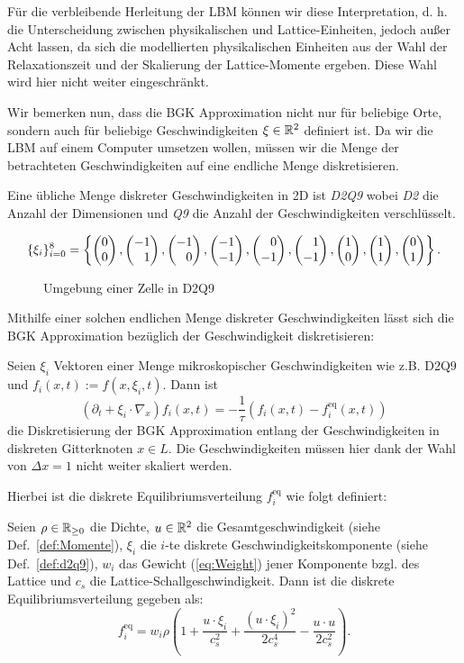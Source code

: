 Für die verbleibende Herleitung der LBM können wir diese Interpretation, d. h. die Unterscheidung zwischen physikalischen und Lattice-Einheiten, jedoch außer Acht lassen, da sich die modellierten physikalischen Einheiten aus der Wahl der Relaxationszeit und der Skalierung der Lattice-Momente ergeben. Diese Wahl wird hier nicht weiter eingeschränkt.

\bigskip

Wir bemerken nun, dass die BGK Approximation nicht nur für beliebige Orte, sondern auch für beliebige Geschwindigkeiten \(\xi \in \mathbb{R}^2\) definiert ist. Da wir die LBM auf einem Computer umsetzen wollen, müssen wir die Menge der betrachteten Geschwindigkeiten auf eine endliche Menge diskretisieren.

Eine übliche Menge diskreter Geschwindigkeiten in 2D ist \emph{D2Q9} wobei \emph{D2} die Anzahl der Dimensionen und \emph{Q9} die Anzahl der Geschwindigkeiten verschlüsselt.

\begin{Definition}[D2Q9 Modell]
\label{def:d2q9}
\[ \{\xi_i\}_{i=0}^8 = \left\{ \begin{pmatrix}0\\0\end{pmatrix}, \begin{pmatrix}-1\\\phantom{-}1\end{pmatrix}, \begin{pmatrix}-1\\\phantom{-}0\end{pmatrix}, \begin{pmatrix}-1\\-1\end{pmatrix}, \begin{pmatrix}\phantom{-}0\\-1\end{pmatrix}, \begin{pmatrix}\phantom{-}1\\-1\end{pmatrix}, \begin{pmatrix}1\\0\end{pmatrix}, \begin{pmatrix}1\\1\end{pmatrix}, \begin{pmatrix}0\\1\end{pmatrix} \right\}. \]
\end{Definition}

\begin{figure}
\centering

\caption{Umgebung einer Zelle in D2Q9}
\end{figure}

Mithilfe einer solchen endlichen Menge diskreter Geschwindigkeiten lässt sich die BGK Approximation bezüglich der Geschwindigkeit diskretisieren:

\begin{Definition}
\label{def:disVelBGK}
Seien \(\xi_i\) Vektoren einer Menge mikroskopischer Geschwindigkeiten wie z.B. D2Q9 und \(f_i(x,t) := f(x,\xi_i,t)\). Dann ist
\[ (\partial_t + \xi_i \cdot \nabla_x) f_i(x,t) = -\frac{1}{\tau} (f_i(x,t) - f_i^\text{eq}(x,t)) \]
die Diskretisierung der BGK Approximation entlang der Geschwindigkeiten in diskreten Gitterknoten \(x \in L\). Die Geschwindigkeiten müssen hier dank der Wahl von \(\Delta x = 1\) nicht weiter skaliert werden.
\end{Definition}

Hierbei ist die diskrete Equilibriumsverteilung \(f_i^\text{eq}\) wie folgt definiert:

\begin{Definition}
\label{def:fieq}
Seien \(\rho \in \mathbb{R}_{\geq 0}\) die Dichte, \(u \in \mathbb{R}^2\) die Gesamtgeschwindigkeit (siehe Def.~\ref{def:Momente}), \(\xi_i\) die \(i\)-te diskrete Geschwindigkeitskomponente (siehe Def.~\ref{def:d2q9}), \(w_i\) das Gewicht (\ref{eq:Weight}) jener Komponente bzgl. des Lattice und \(c_s\) die Lattice-Schallgeschwindigkeit. Dann ist die diskrete Equilibriumsverteilung gegeben als:
\[f_i^\text{eq} = w_i \rho \left( 1 + \frac{u \cdot \xi_i}{c_s^2} + \frac{(u \cdot \xi_i)^2}{2c_s^4} - \frac{u \cdot u}{2c_s^2} \right).\]
\end{Definition}

